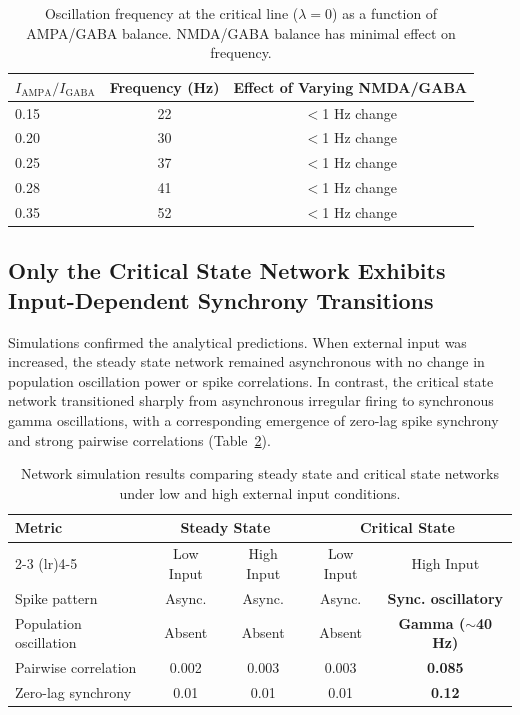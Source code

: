 \documentclass[11pt]{article}
\begin{document}
\begin{table}[H]
\centering
\caption{Oscillation frequency at the critical line ($\lambda = 0$) as a function of AMPA/GABA balance. NMDA/GABA balance has minimal effect on frequency.}
\label{tab:frequency}
\begin{tabular}{lcc}
\toprule
\textbf{$I_{\mathrm{AMPA}}/I_{\mathrm{GABA}}$} & \textbf{Frequency (Hz)} & \textbf{Effect of Varying NMDA/GABA} \\
\midrule
0.15 & 22 & $<$1 Hz change \\
0.20 & 30 & $<$1 Hz change \\
0.25 & 37 & $<$1 Hz change \\
0.28 & 41 & $<$1 Hz change \\
0.35 & 52 & $<$1 Hz change \\
\bottomrule
\end{tabular}
\end{table}

\subsection{Only the Critical State Network Exhibits Input-Dependent Synchrony Transitions}

Simulations confirmed the analytical predictions. When external input was increased, the steady state network remained asynchronous with no change in population oscillation power or spike correlations. In contrast, the critical state network transitioned sharply from asynchronous irregular firing to synchronous gamma oscillations, with a corresponding emergence of zero-lag spike synchrony and strong pairwise correlations (Table~\ref{tab:simulation_results}).

\begin{table}[H]
\centering
\caption{Network simulation results comparing steady state and critical state networks under low and high external input conditions.}
\label{tab:simulation_results}
\begin{tabular}{lcccc}
\toprule
\textbf{Metric} & \multicolumn{2}{c}{\textbf{Steady State}} & \multicolumn{2}{c}{\textbf{Critical State}} \\
\cmidrule(lr){2-3} \cmidrule(lr){4-5}
 & Low Input & High Input & Low Input & High Input \\
\midrule
Spike pattern & Async. & Async. & Async. & \textbf{Sync. oscillatory} \\
Population oscillation & Absent & Absent & Absent & \textbf{Gamma ($\sim$40 Hz)} \\
Pairwise correlation & 0.002 & 0.003 & 0.003 & \textbf{0.085} \\
Zero-lag synchrony & 0.01 & 0.01 & 0.01 & \textbf{0.12} \\
\bottomrule
\end{tabular}
\end{table}
\end{document}
